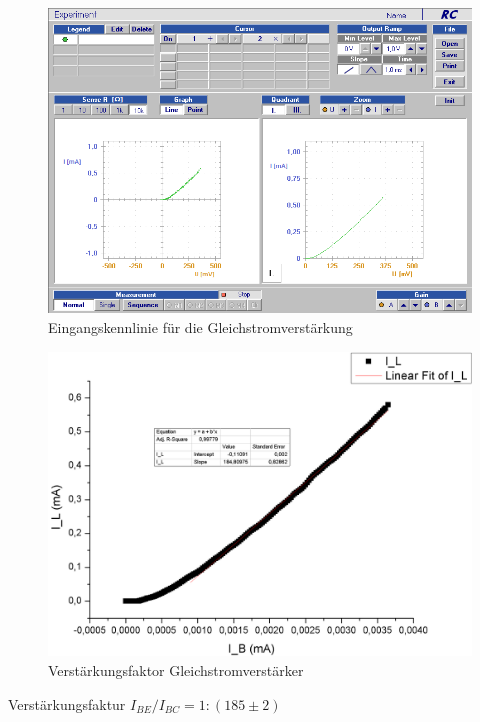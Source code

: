\documentclass[12pt,a4paper]{article}
\begin{document}
\begin{figure}[H]
	\centering
	\includegraphics[scale=0.45]{./data/Braun_Kurz_PS8/Gleichstromverstaerkung.png}
	\caption{Eingangskennlinie für die Gleichstromverstärkung}
	\label{fig:eingangsskennlinien}
\end{figure}

\begin{figure}[H]
	\centering
	\includegraphics[scale=0.45]{./data/stromverstaerkung.png}
	\caption{Verstärkungsfaktor Gleichstromverstärker}
	\label{fig:verstaerker_faktor}
\end{figure}
Verstärkungsfaktur $I_{BE}/I_{BC}= 1: (185\pm 2)$
\end{document}
